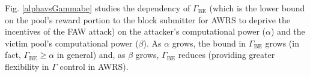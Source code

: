 Fig. \ref{alphavsGammabe} studies the dependency of $\Gamma_{\mbox{BE}}$ (which is the lower bound on the pool's reward portion to the block submitter for AWRS to deprive the incentives of the FAW attack) on the attacker's computational power ($\alpha$) and the victim pool's computational power ($\beta$).
As $\alpha$ grows, the bound in $\Gamma_{\mbox{BE}}$ grows (in fact, $\Gamma_{\mbox{BE}}\geq \alpha$ in general) and, as $\beta$ grows, $\Gamma_{\mbox{BE}}$ reduces (providing greater flexibility in $\Gamma$ control in AWRS).
